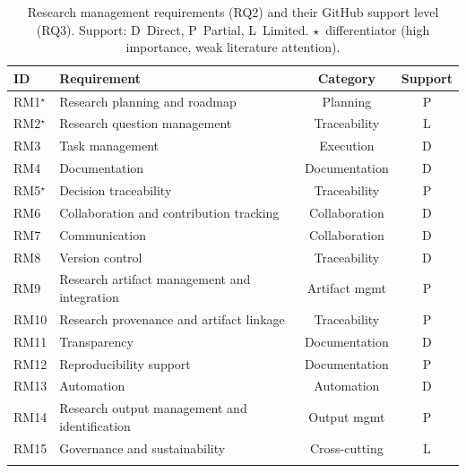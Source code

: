 \documentclass[pdflatex,sn-mathphys-num]{sn-jnl}%
\begin{document}
\begin{table}[h]
\caption{Research management requirements (RQ2) and their GitHub support level (RQ3). Support: D~Direct, P~Partial, L~Limited. $\star$~differentiator (high importance, weak literature attention).}\label{tab:requirements}
\begin{tabular}{@{}llcc@{}}
\toprule
ID & Requirement & Category & Support \\
\midrule
RM1$^\star$  & Research planning and roadmap        & Planning       & P \\
RM2$^\star$  & Research question management         & Traceability   & L \\
RM3   & Task management                     & Execution      & D \\
RM4   & Documentation                      & Documentation  & D \\
RM5$^\star$  & Decision traceability               & Traceability   & P \\
RM6   & Collaboration and contribution tracking & Collaboration & D \\
RM7   & Communication                      & Collaboration  & D \\
RM8   & Version control                    & Traceability   & D \\
RM9   & Research artifact management and integration & Artifact mgmt & P \\
RM10  & Research provenance and artifact linkage & Traceability & P \\
RM11  & Transparency                      & Documentation  & D \\
RM12  & Reproducibility support            & Documentation  & P \\
RM13  & Automation                        & Automation     & D \\
RM14  & Research output management and identification & Output mgmt & P \\
RM15  & Governance and sustainability      & Cross-cutting  & L \\
\botrule
\end{tabular}
\end{table}
\end{document}
